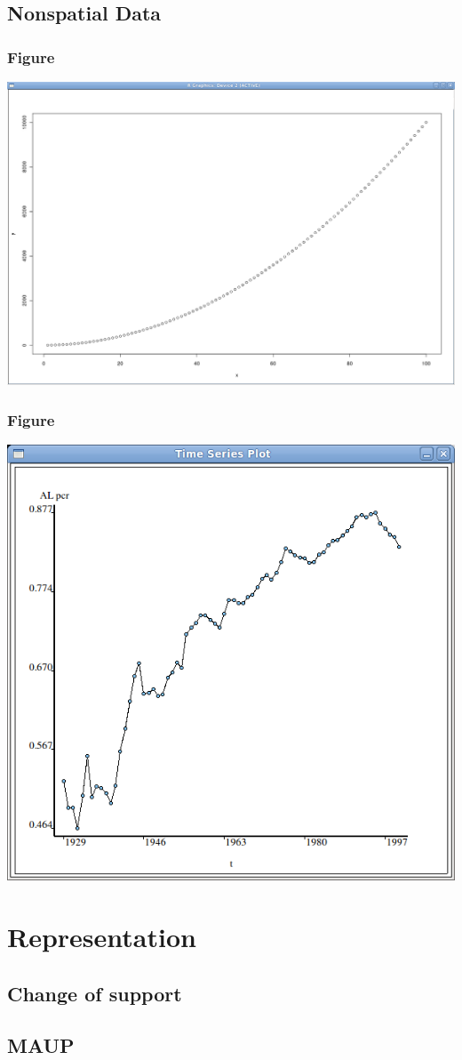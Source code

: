 \documentclass[nototal]{beamer}
\begin{document}
\subsection{Nonspatial Data}

\begin{frame}
  \frametitle{Figure}
  \begin{center}
    \includegraphics[width=.85\linewidth]{screenshot_003.png}
  \end{center}
\end{frame}

\begin{frame}
  \frametitle{Figure}
  \begin{center}
    \includegraphics[width=.85\linewidth]{starsnew.png}
  \end{center}
\end{frame}


\section{Representation}
\subsection{Change of support}
\subsection{MAUP}
\end{document}
